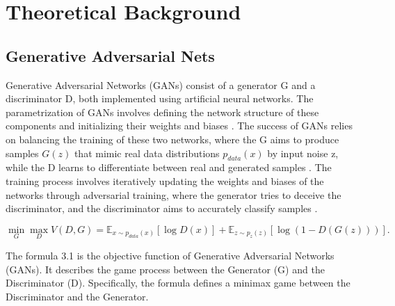 \chapter{Theoretical Background}
\label{Theoretical Background}

\section*{Generative Adversarial Nets}

Generative Adversarial Networks (GANs) consist of a generator G and a discriminator D, 
both implemented using artificial neural networks. The parametrization of GANs involves 
defining the network structure of these components and initializing their weights and biases \citep{10.1007/s10928-021-09787-4}. 
The success of GANs relies on balancing the training of these two networks, where the 
G aims to produce samples $G(z)$ that mimic real data distributions $p_{data}(x)$ by input noise z, while the D 
learns to differentiate between real and generated samples \citep{10.1109/taslp.2017.2761547}. 
The training process involves iteratively updating the weights and biases of the networks through 
adversarial training, where the generator tries to deceive the discriminator, and the discriminator 
aims to accurately classify samples \citep{10.48550/arxiv.1802.05637}.

\begin{equation}
    \min_{G} \max_{D} V(D, G) = \mathbb{E}_{x \sim p_{data}(x)} [\log D(x)] + \mathbb{E}_{z \sim p_{z}(z)} [\log(1 - D(G(z)))].
\end{equation}


The formula 3.1 is the objective function of Generative Adversarial Networks (GANs). 
It describes the game process between the Generator (G) and the Discriminator (D). Specifically, the formula defines a minimax game between the Discriminator and the Generator.

